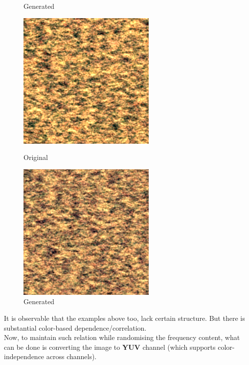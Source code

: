 \documentclass{article}
\begin{document}
\begin{figure}[!htb]
\begin{center}
      \caption{Generated}
    \end{center}
    \endminipage
    \end{figure}
    
    \begin{figure}[!htb]
    \begin{center}
      \includegraphics[scale=0.8]{5/report/random/2.png}
      \caption{Original}
    \end{center}
    \endminipage \hfill
    \begin{center}
      \includegraphics[scale=0.8]{5/report/random/2_c.png}
      \caption{Generated}
    \end{center}
    \endminipage
    \end{figure}

    It is observable that the examples above too, lack certain structure. But there is substantial color-based dependence/correlation.\\[5pt]
    Now, to maintain such relation while randomising the frequency content, what can be done is converting the image to \textbf{YUV} channel (which supports color-independence across channels).
\end{document}
